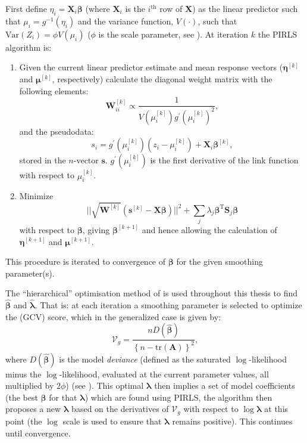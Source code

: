 First define $\eta_i = \mathbf{X}_i\bm{\beta}$ (where $\mathbf{X}_i$ is the $i^\text{th}$ row of $\mathbf{X}$) as the linear predictor such that $\mu_i = g^{-1}(\eta_i)$ and the variance function, $V(\cdot)$, such that $\text{Var}\left ( Z_i \right ) = \phi V(\mu_i)$ ($\phi$ is the scale parameter, see \cite[p. 62]{simonbook}). At iteration $k$ the PIRLS algorithm is:
\begin{enumerate}
\item Given the current linear predictor estimate and mean response vectors ($\bm{\eta}^{[k]}$ and $\bm{\mu}^{[k]}$, respectively) calculate the diagonal weight matrix with the following elements:
\begin{equation*}
\mathbf{W}^{[k]}_{ii}  \propto \frac{1}{V(\mu_i^{[k]})g^\prime(\mu_i^{[k]})^2},
\end{equation*}
and the pseudodata:
\begin{equation*}
s_i = g^\prime(\mu_i^{[k]})(z_i-\mu_i^{[k]}) + \mathbf{X}_i\bm{\beta}^{[k]},
\end{equation*}
stored in the $n$-vector $\mathbf{s}$. $g^\prime(\mu_i^{[k]})$ is the first derivative of the link function with respect to $\mu_i^{[k]}$.
\item Minimize
\begin{equation*}
\lvert \lvert \sqrt{\mathbf{W}^{[k]}} (\mathbf{s}^{[k]} - \mathbf{X}\bm{\beta})  \rvert \rvert^2 + \sum_j \lambda_j \bm{\beta}^\text{T}\mathbf{S}_j\bm{\beta}
\end{equation*}
with respect to $\bm{\beta}$, giving $\bm{\beta}^{[k+1]}$ and hence allowing the calculation of $\bm{\eta}^{[k+1]}$ and $\bm{\mu}^{[k+1]}$.
\end{enumerate}
This procedure is iterated to convergence of $\bm{\beta}$ for the given smoothing parameter(s).

The ``hierarchical'' optimisation method of  is used throughout this thesis to find $\bm{\hat{\beta}}$ and $\bm{\hat{\lambda}}$. That is: at each iteration a smoothing parameter is selected to optimize the (GCV) score, which in the generalized case is given by:
\begin{equation*}
\mathcal{V}_g = \frac{n D(\bm{\hat{\beta}})}{\left \{n-\text{tr}(\mathbf{A}) \right \}^2},
\end{equation*}
where $D(\bm{\hat{\beta}})$ is the model \textit{deviance} (defined as the saturated $\log$-likelihood minus the $\log$-likelihood, evaluated at the current parameter values, all multiplied by $2\phi$) (see \cite[p. 178]{simonbook}). This optimal $\bm{\lambda}$ then implies a set of model coefficients (the best $\bm{\beta}$ for that $\bm{\lambda}$) which are found using PIRLS, the algorithm then proposes a new $\bm{\lambda}$ based on the derivatives of $\mathcal{V}_g$ with respect to $\log \bm{\lambda}$ at this point (the $\log$ scale is used to ensure that $\bm{\lambda}$ remains positive). This continues until convergence.

